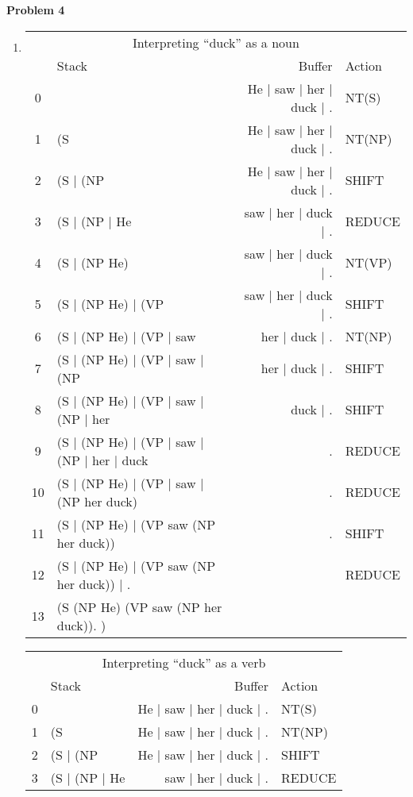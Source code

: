 {\bf Problem 4}

\begin{enumerate}[label={\arabic*.}]
    \item
	\begin{center}
	    \begin{tabular}{ c|l|r|l }  
		\multicolumn{4}{c}{Interpreting ``duck'' as a noun} \\   
		& Stack & Buffer & Action \\
		\hline
		0 & & He $|$ saw $|$ her $|$ duck $|$ . & NT(S) \\
		1 & (S & He $|$ saw $|$ her $|$ duck $|$ . & NT(NP) \\
		2 & (S $|$ (NP & He $|$ saw $|$ her $|$ duck $|$ . & SHIFT \\
		3 & (S $|$ (NP $|$ He & saw $|$ her $|$ duck $|$ . & REDUCE \\
		4 & (S $|$ (NP He) & saw $|$ her $|$ duck $|$ . & NT(VP) \\
		5 & (S $|$ (NP He) $|$ (VP & saw $|$ her $|$ duck $|$ . & SHIFT \\
		6 & (S $|$ (NP He) $|$ (VP $|$ saw & her $|$ duck $|$ . & NT(NP) \\
		7 & (S $|$ (NP He) $|$ (VP $|$ saw $|$ (NP & her $|$ duck $|$ . & SHIFT \\
		8 & (S $|$ (NP He) $|$ (VP $|$ saw $|$ (NP $|$ her & duck $|$ . & SHIFT \\
		9 & (S $|$ (NP He) $|$ (VP $|$ saw $|$ (NP $|$ her $|$ duck & . & REDUCE \\
		10 & (S $|$ (NP He) $|$ (VP $|$ saw $|$ (NP her duck) & . & REDUCE \\
		11 & (S $|$ (NP He) $|$ (VP saw (NP her duck)) & . & SHIFT \\
		12 & (S $|$ (NP He) $|$ (VP saw (NP her duck)) $|$ . & & REDUCE \\
		13 & (S (NP He) (VP saw (NP her duck)). ) & & \\
		\hline
	    \end{tabular}
	    \begin{tabular}{ c|l|r|l }  
		\multicolumn{4}{c}{Interpreting ``duck'' as a verb} \\   
		& Stack & Buffer & Action \\
		\hline
		0 & & He $|$ saw $|$ her $|$ duck $|$ . & NT(S) \\
		1 & (S & He $|$ saw $|$ her $|$ duck $|$ . & NT(NP) \\
		2 & (S $|$ (NP & He $|$ saw $|$ her $|$ duck $|$ . & SHIFT \\
		3 & (S $|$ (NP $|$ He & saw $|$ her $|$ duck $|$ . & REDUCE \\

\end{tabular}
\end{center}
\end{enumerate}
